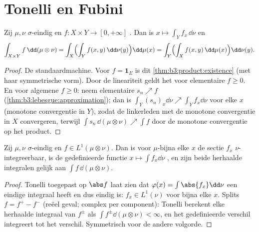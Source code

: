 \section{Tonelli en Fubini}

\begin{theorem}[Tonelli]\label{thm:b3:product:tonelli}
Zij $\mu, \nu$ $\sigma$-eindig en $f \colon X\times Y \to [0,
+\infty]$ . Dan is $x \mapsto \int_Y f_x\,\dd\nu$ 
en
\[
\int_{X\times Y}f\,\dd(\mu\otimes\nu)
= \int_X\Bigl(\int_Y f(x,y)\,\dd\nu(y)\Bigr)\dd\mu(x)
= \int_Y\Bigl(\int_X f(x,y)\,\dd\mu(x)\Bigr)\dd\nu(y).
\]
\end{theorem}

\begin{proof}
De standaardmachine. Voor $f = \mathbf 1_E$ is dit
\cref{thm:b3:product:existence} (met haar symmetrische vorm). Door
de lineariteit geldt het voor elementaire $f \geq 0$. En voor
algemene $f \geq 0$: neem elementaire $s_n \nearrow f$
(\cref{thm:b3:lebesgue:approximation}); dan is $\int_Y(s_n)_x
\dd\nu \nearrow \int_Y f_x\dd\nu$ voor elke $x$ (monotone
convergentie in $Y$), zodat de linkerleden met de monotone
convergentie in $X$ convergeren, terwijl $\int s_n\,
\dd(\mu\otimes\nu) \nearrow \int f$ door de monotone convergentie
op het product.
\end{proof}

\begin{theorem}[Fubini]\label{thm:b3:product:fubini}
Zij $\mu, \nu$ $\sigma$-eindig en $f \in L^1(\mu\otimes\nu)$. Dan
is voor $\mu$-bijna elke $x$ de sectie $f_x$ $\nu$-integreerbaar,
is de  gedefinieerde functie $x \mapsto \int
f_x\dd\nu$ , en zijn beide herhaalde integralen
gelijk aan $\int f\,\dd(\mu\otimes\nu)$.
\end{theorem}

\begin{proof}
Tonelli toegepast op $\abs f$ laat zien dat $\varphi(x) =
\int\abs{f_x} \dd\nu$ een eindige integraal heeft en dus  eindig is: $f_x \in L^1(\nu)$ voor bijna elke $x$. Splits
$f = f^+ - f^-$ (reëel geval; complex per component): Tonelli
berekent elke herhaalde integraal van $f^\pm$ als $\int
f^\pm\dd(\mu\otimes\nu) < \infty$, en het 
gedefinieerde verschil integreert tot het verschil. Symmetrisch
voor de andere volgorde.
\end{proof}

